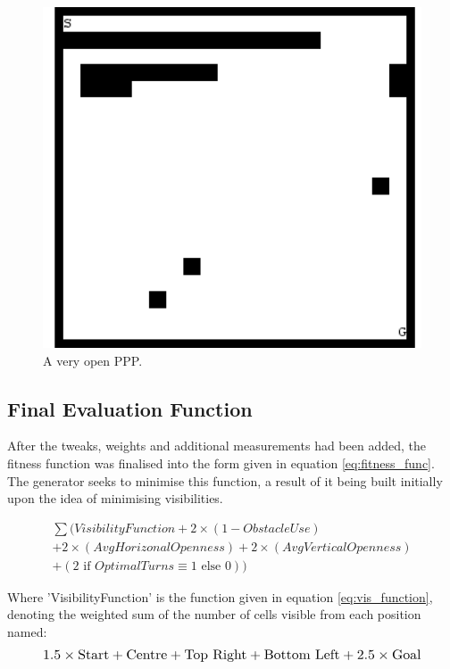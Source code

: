\documentclass[authoryearcitations]{UoYCSproject}
\begin{document}
\begin{figure}
\graphicspath{ {DesignImpPics/} }
\includegraphics[width=1\textwidth]{wide_plain.png}
\caption{ A very open PPP.}
\label{fig:open_ppp}
\end{figure}

\subsection{Final Evaluation Function}
\label{sec:function}
After the tweaks, weights and additional measurements had been added, the fitness function was finalised into the form given in equation \ref{eq:fitness_func}. The generator seeks to minimise this function, a result of it being built initially upon the idea of minimising visibilities.

\begin{multline}
\sum(VisibilityFunction + 2\times(1-ObstacleUse)\\ + 2\times(AvgHorizonalOpenness) + 2\times(AvgVerticalOpenness)\\+ (2 \text{ if } OptimalTurns \equiv 1 \text{ else } 0))
\label{eq:fitness_func}
\end{multline}

Where 'VisibilityFunction' is the function given in equation  \ref{eq:vis_function}, denoting the weighted sum of the number of cells visible from each position named:
\begin{equation}
\resizebox{0.9\textwidth}{!}{$
1.5 \times \text{Start}+\text{Centre}+\text{Top Right}+\text{Bottom Left}+2.5 \times \text{Goal}
$}
\label{eq:vis_function}
\end{equation}
\end{document}

